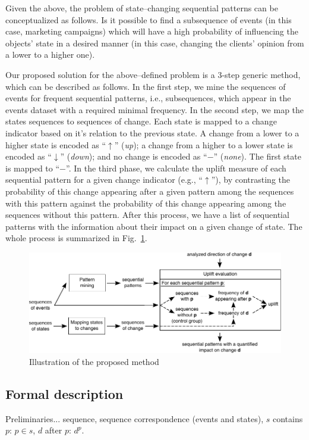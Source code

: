 \documentclass[runningheads,a4paper]{llncs}
\begin{document}
Given the above, the problem of state--changing sequential patterns can be conceptualized as follows.
Is it possible to find a subsequence of events (in this case, marketing campaigns) which will have a high probability of influencing the objects' state in a desired manner (in this case, changing the clients' opinion from a lower to a higher one).

Our proposed solution for the above--defined problem is a 3-step generic method, which can be described as follows.
In the first step, we mine the sequences of events for frequent sequential patterns, i.e., subsequences, which appear in the events dataset with a required minimal frequency.
In the second step, we map the states sequences to sequences of change.
Each state is mapped to a change indicator based on it's relation to the previous state.
A change from a lower to a higher state is encoded as ``$\uparrow$'' (\textit{up}); a change from a higher to a lower state is encoded as ``$\downarrow$'' (\textit{down}); and no change is encoded as ``$-$'' (\textit{none}).
The first state is mapped to ``$-$''.
In the third phase, we calculate the uplift measure of each sequential pattern for a given change indicator (e.g., ``$\uparrow$''), by contrasting the probability of this change appearing after a given pattern among the sequences with this pattern against the probability of this change appearing among the sequences without this pattern.
After this process, we have a list of sequential patterns with the information about their impact on a given change of state.
The whole process is summarized in Fig.~\ref{fig:concept}.

\begin{figure}[!ht]
	\centering
		\includegraphics[width=\textwidth]{images/concept}
	\caption{Illustration of the proposed method}
	\label{fig:concept}
\end{figure}

\subsection{Formal description}
Preliminaries...
sequence,
sequence correspondence (events and states),
$s$ contains $p$: $p\in s$,
$d$ after $p$: $d^p$.
\end{document}
